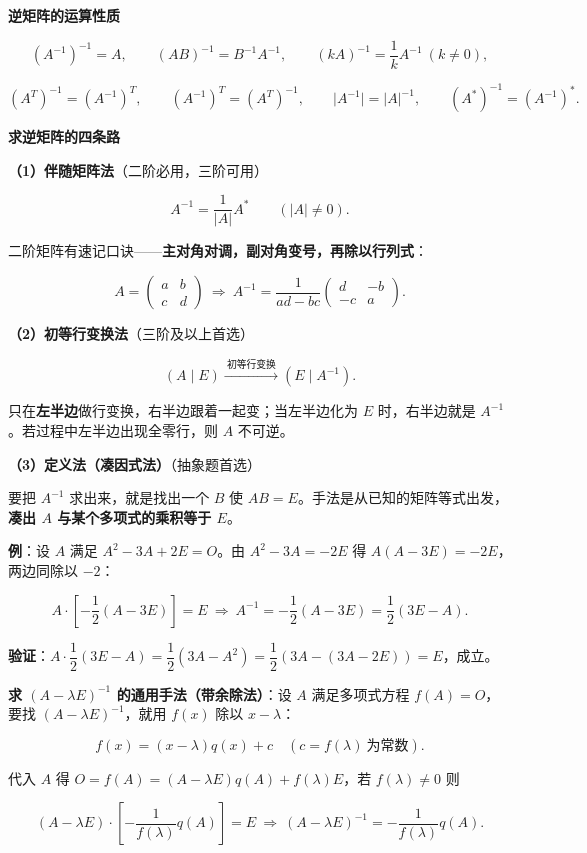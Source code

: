 \documentclass[11pt,openany,UTF8]{ctexbook}
\begin{document}
\textbf{逆矩阵的运算性质}

\[(A^{-1})^{-1}=A,\qquad (AB)^{-1}=B^{-1}A^{-1},\qquad (kA)^{-1}=\frac{1}{k}A^{-1}\ (k\ne0),\]

\[(A^T)^{-1}=(A^{-1})^T,\qquad (A^{-1})^T=(A^T)^{-1},\qquad \vert A^{-1}\vert=\vert A\vert^{-1},\qquad (A^*)^{-1}=(A^{-1})^* .\]

\textbf{求逆矩阵的四条路}

\textbf{（1）伴随矩阵法}（二阶必用，三阶可用）

\[A^{-1}=\frac{1}{\vert A\vert}A^*\qquad(\vert A\vert\ne0).\]

二阶矩阵有速记口诀——\textbf{主对角对调，副对角变号，再除以行列式}：

\[A=\begin{pmatrix}a&b\\c&d\end{pmatrix}\ \Longrightarrow\ A^{-1}=\frac{1}{ad-bc}\begin{pmatrix}d&-b\\-c&a\end{pmatrix}.\]

\textbf{（2）初等行变换法}（三阶及以上首选）

\[(A\mid E)\xrightarrow{\ \text{初等行变换}\ }(E\mid A^{-1}).\]

只在\textbf{左半边}做行变换，右半边跟着一起变；当左半边化为 $E$ 时，右半边就是 $A^{-1}$。若过程中左半边出现全零行，则 $A$ 不可逆。

\textbf{（3）定义法（凑因式法）}（抽象题首选）

要把 $A^{-1}$ 求出来，就是找出一个 $B$ 使 $AB=E$。手法是从已知的矩阵等式出发，\textbf{凑出 $A$ 与某个多项式的乘积等于 $E$}。

\textbf{例}：设 $A$ 满足 $A^2-3A+2E=O$。由 $A^2-3A=-2E$ 得 $A(A-3E)=-2E$，两边同除以 $-2$：

\[A\cdot\left[-\frac{1}{2}(A-3E)\right]=E\ \Longrightarrow\ A^{-1}=-\frac{1}{2}(A-3E)=\frac{1}{2}(3E-A).\]

\textbf{验证}：$A\cdot\dfrac{1}{2}(3E-A)=\dfrac{1}{2}(3A-A^2)=\dfrac{1}{2}(3A-(3A-2E))=E$，成立。

\textbf{求 $(A-\lambda E)^{-1}$ 的通用手法（带余除法）}：设 $A$ 满足多项式方程 $f(A)=O$，要找 $(A-\lambda E)^{-1}$，就用 $f(x)$ 除以 $x-\lambda$：

\[f(x)=(x-\lambda)q(x)+c\quad(c=f(\lambda)\ \text{为常数}).\]

代入 $A$ 得 $O=f(A)=(A-\lambda E)q(A)+f(\lambda)E$，若 $f(\lambda)\ne0$ 则

\[(A-\lambda E)\cdot\left[-\frac{1}{f(\lambda)}q(A)\right]=E\ \Longrightarrow\ (A-\lambda E)^{-1}=-\frac{1}{f(\lambda)}q(A).\]
\end{document}
